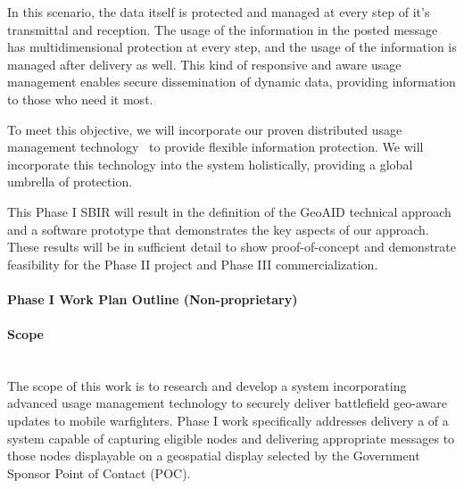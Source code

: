 \documentclass{sbir}
\begin{document}
In this scenario, the data itself is protected and managed at every step of it's transmittal and reception. The usage of the information in the posted message has multidimensional protection at every step, and the usage of the information is managed after delivery as well. This kind of responsive and aware usage management enables secure dissemination of dynamic data, providing information to those who need it most.

To meet this objective, we will incorporate our proven distributed usage management technology~\cite{HeHeShGiJa:11,JaHeLa:10,JaLaHe:11} to provide flexible information protection. We will incorporate this technology into the system holistically, providing a global umbrella of protection.


{This Phase I SBIR will result in the definition of the GeoAID technical approach and a software prototype that demonstrates the key aspects of our approach. These results will be in sufficient detail to show proof-of-concept and demonstrate feasibility for the Phase II project and Phase III commercialization.}

\newpage 
\lfoot{}
\cfoot{\color{LeTigre}\vspace*{-1.25em}{\scshape\fromproposaltitle}~\\ \rm\thepage}

\paragraph{Phase I Work Plan Outline (Non-proprietary)}
\paragraph{Scope}~\\
The scope of this work is to research and develop a system incorporating advanced usage management technology to securely deliver battlefield geo-aware updates to mobile warfighters. Phase I work specifically addresses delivery a of a system capable of capturing eligible nodes and delivering appropriate messages to those nodes displayable on a geospatial display selected by the Government Sponsor Point of Contact (POC). %
\end{document}
